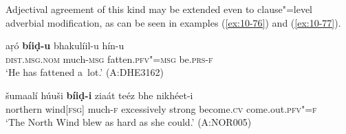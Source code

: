 Adjectival agreement of this kind may be extended even to clause"=level adverbial modification, as can be seen in examples (\ref{ex:10-76}) and (\ref{ex:10-77}).

\begin{exe}
\ex
\label{ex:10-76}
\gll aṛó \textbf{bíiḍ-u} bhakulíil-u hín-u\\
 \textsc{dist.msg.nom} much-\textsc{msg} fatten.\textsc{pfv"=msg} be.\textsc{prs-f} \\
\glt `He has fattened a~lot.' (A:DHE3162)

\ex
\label{ex:10-77}
\gll šumaalí húuši \textbf{bíiḍ-i} ziaát teéz bhe nikhéet-i\\
northern wind[\textsc{fsg}] much-\textsc{f} excessively strong become.\textsc{cv} come.out.\textsc{pfv"=f}\\
\glt `The North Wind blew as hard as she could.' (A:NOR005)
\end{exe}